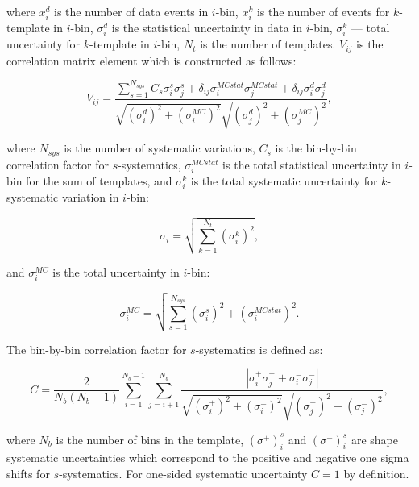 \documentclass[12pt]{article}
\begin{document}
\noindent where $x^{d}_{i}$ is the number of data events in $i$-bin,
$x^{k}_{i}$ is the number of events for $k$-template in $i$-bin,
$\sigma_{i}^{d}$ is the statistical uncertainty in data in $i$-bin,
$\sigma_{i}^{k}$ --- total uncertainty for $k$-template in $i$-bin,
$N_{t}$ is the number of templates.
$V_{ij}$ is the correlation matrix element which is constructed as follows:

\begin{equation}
V_{ij} = \frac{\sum\limits_{s=1}^{N_{sys}} C_{s}
\sigma_{i}^{s}\sigma_{j}^{s} +
\delta_{ij}\sigma_{i}^{MCstat}\sigma_{j}^{MCstat} +
\delta_{ij}\sigma_{i}^{d}\sigma_{j}^{d}}
{\sqrt{
(\sigma_{i}^{d})^2 +
(\sigma_{i}^{MC})^2
}
\sqrt{
(\sigma_{j}^{d})^2 +
(\sigma_{j}^{MC})^2
}
},
\end{equation}

\noindent where $N_{sys}$ is the number of systematic variations,
$C_{s}$ is the bin-by-bin correlation factor for $s$-systematics,
$\sigma_{i}^{MCstat}$ is the total statistical uncertainty in $i$-bin
for the sum of templates, and $\sigma_{i}^{k}$ is the total
systematic uncertainty for $k$-systematic variation in $i$-bin:

\begin{equation}
\sigma_{i} = \sqrt{\sum\limits_{k=1}^{N_{t}}(\sigma_{i}^{k})^{2}},
\end{equation}

\noindent and $\sigma_{i}^{MC}$ is the total uncertainty in $i$-bin:

\begin{equation}
\sigma_{i}^{MC} = \sqrt{\sum\limits_{s=1}^{N_{sys}}(\sigma_{i}^{s})^2+(\sigma_{i}^{MCstat})^2}.
\end{equation}

\noindent The bin-by-bin correlation factor for $s$-systematics is
defined as:

\begin{equation}
C = \frac{2}{N_{b}(N_{b}-1)} \sum\limits_{i=1}^{N_{b}-1}
\sum\limits_{j=i+1}^{N_{b}} \frac{|\sigma_{i}^{+}\sigma_{j}^{+} +
\sigma_{i}^{-}\sigma_{j}^{-}|}
{\sqrt{(\sigma_{i}^{+})^{2} + (\sigma_{i}^{-})^{2}}
\sqrt{(\sigma_{j}^{+})^{2} + (\sigma_{j}^{-})^{2}} },
\end{equation}

\noindent where $N_{b}$ is the number of bins in the template, 
$(\sigma^{+})_{i}^{s}$ and $(\sigma^{-})_{i}^{s}$ are
shape systematic uncertainties which correspond to the positive and negative
one sigma shifts for $s$-systematics. 
For one-sided systematic uncertainty $C = 1$ by definition.
\end{document}
